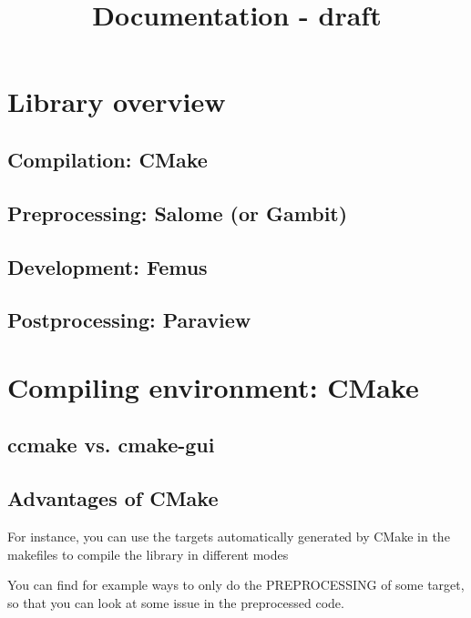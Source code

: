 \documentclass[10pt]{book}
\title{Documentation - draft}
\author{}
\date{}
\begin{document}
\maketitle

 \setcounter{tocdepth}{4}
\setcounter{secnumdepth}{4}
\tableofcontents 
{}


\part{Library overview}


 \chapter{Compilation: CMake}
 
 \chapter{Preprocessing: Salome (or Gambit)}
 
 \chapter{Development: Femus}
 
 \chapter{Postprocessing: Paraview}





\part{Compiling environment: CMake}


\chapter{ccmake vs. cmake-gui}


\chapter{Advantages of CMake}

  For instance, you can use the targets automatically generated by CMake in the makefiles
  to compile the library in different modes
  
  You can find for example ways to only do the PREPROCESSING of some target,
  so that you can look at some issue in the preprocessed code.
  
\end{document}
